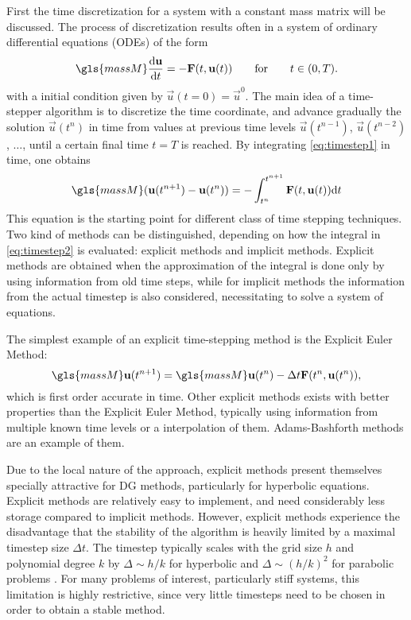 First the time discretization for a system with a constant mass matrix will be discussed. The process of discretization results often in a system of ordinary differential equations (ODEs) of the form
\begin{equation}
\gls{massM}\frac{\text{d}\vec{u}}{\text{d}t} = - \vec{F}(t,\vec{u}(t))\qquad \text{for}\qquad t \in (0,T).\label{eq:timestep1}
\end{equation}
with a initial condition given by $\vec{u}(t=0) = \vec{u}^0$. The main idea of a time-stepper algorithm is to discretize the time coordinate, and advance gradually the solution $\vec{u}(t^n)$ in time from values at previous time levels $\vec{u}(t^{n-1})$, $\vec{u}(t^{n-2})$, $\dots$,  until a certain final time $t = T$ is reached.
By integrating \cref{eq:timestep1} in time, one obtains
\begin{equation}
\gls{massM}(\vec{u}(t^{n+1})-\vec{u}(t^{n})) = - \int_{t^n}^{t^{n+1}}\vec{F}(t,\vec{u}(t)) \text{d}t \label{eq:timestep2}
\end{equation}
This equation is the starting point for different class of time stepping techniques. Two kind of methods can be distinguished, depending on how the integral in \cref{eq:timestep2} is evaluated: explicit methods and implicit methods. Explicit methods are obtained when the approximation of the integral is done only by using information from old time steps, while for implicit methods the information from the actual timestep is also considered, necessitating to solve a system of equations.

The simplest example of an explicit time-stepping method is the Explicit Euler Method:
\begin{equation}
\gls{massM}\vec{u}(t^{n+1})= \gls{massM}\vec{u}(t^{n})  - \Delta t \vec{F}(t^n,\vec{u}(t^n)),
\end{equation}
which is first order accurate in time. Other explicit methods exists with better properties than the Explicit Euler Method, typically using information from multiple known time levels or a interpolation of them. Adams-Bashforth methods are an example of them. 

Due to the local nature of the approach, explicit methods present themselves specially attractive for DG methods, particularly for hyperbolic equations. Explicit methods are relatively easy to implement, and need considerably less storage compared to implicit methods. However, explicit methods experience the disadvantage that the stability of the algorithm is heavily limited by a maximal timestep size $\Delta t$. The timestep typically scales with the grid size $h$ and polynomial degree $k$ by $\Delta \sim h/k$ for hyperbolic and $\Delta \sim (h/k)^2$ for parabolic problems \parencite{gassnerContributionConstructionDiffusion2007}. For many problems of interest, particularly stiff systems, this limitation is highly restrictive, since very little timesteps need to be chosen in order to obtain a stable method. 

